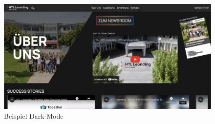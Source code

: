 \begin{figure}
   \begin{minipage}[b]{\linewidth} 
      \includegraphics[scale=0.3]{pics/Example_Darkmode.png}
      \caption{Beispiel Dark-Mode}
      \label{fig:impl:example_darkmode}
   \end{minipage}
   \hspace{.05\linewidth}
\end{figure}
